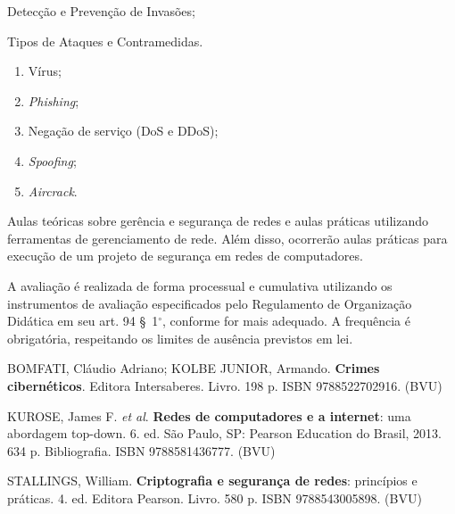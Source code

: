 \begin{pud}
\begin{description}[itemsep=0em]
	    \item[UNIDADE IV:] Detecção e Prevenção de Invasões;
	
	        
	    \item[UNIDADE II:] Tipos de Ataques e Contramedidas.
	         \begin{enumerate}[itemsep=0em, topsep=0em]
				\item Vírus;
				\item \textit{Phishing};
				\item Negação de serviço (DoS e DDoS);
				\item \textit{Spoofing};
				\item \textit{Aircrack}.
	        \end{enumerate}
	                                
	
	\end{description}
	
	\metodologia
	Aulas teóricas sobre gerência e segurança de redes e aulas práticas utilizando ferramentas de gerenciamento de rede. Além disso, ocorrerão aulas práticas para execução de um projeto de segurança em redes de computadores.


	\avaliacao
	A avaliação é realizada de forma processual e cumulativa utilizando os instrumentos de avaliação especificados pelo Regulamento de Organização Didática em seu art. 94 \S~1$^\circ$, conforme for mais adequado. A frequência é obrigatória, respeitando os limites de ausência previstos em lei.
	
		
	
	\begin{bibbasica}
	
		\item BOMFATI, Cláudio Adriano; KOLBE JUNIOR, Armando. \textbf{Crimes cibernéticos}. Editora Intersaberes. Livro. 198 p. ISBN 9788522702916. (BVU)
		\item KUROSE, James F. \textit{et al}. \textbf{Redes de computadores e a internet}: uma abordagem top-down. 6. ed. São Paulo, SP: Pearson Education do Brasil, 2013. 634 p. Bibliografia. ISBN 9788581436777. (BVU)
		\item STALLINGS, William. \textbf{Criptografia e segurança de redes}: princípios e práticas. 4. ed.  Editora Pearson. Livro. 580 p. ISBN 9788543005898. (BVU)
		
		
		
	\end{bibbasica}
	
	\begin{bibcomplementar}
	

\end{bibcomplementar}
\end{pud}

